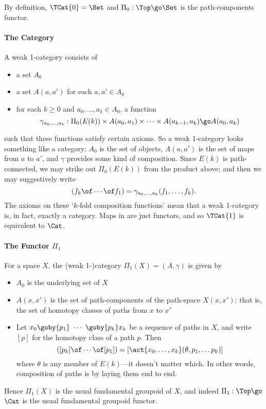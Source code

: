 
By definition, $\TCat{0}=\Set$ and $\Pi_0: \Top\go\Set$ is the
path-components functor.



\paragraph{The Category }

A weak 1-category  consists of
%
\begin{itemize}
\item a set $A_0$
\item a set $A(a,a')$ for each $a, a' \in A_0$
\item for each $k\geq 0$ and $a_0, \ldots, a_k \in A_0$, a function
\[
\gamma_{a_0, \ldots, a_k}:
\Pi_0(E(k)) \times A(a_0,a_1) \times\cdots\times A(a_{k-1},a_k)
\go
A(a_0,a_k)
\]
\end{itemize}
%
such that these functions satisfy certain axioms.  So a weak 1-category looks
something like a category: $A_0$ is the set of objects, $A(a,a')$ is
the set of maps from $a$ to $a'$, and $\gamma$ provides some kind of
composition.  Since $E(k)$ is path-connected, we may strike out $\Pi_0(E(k))$
from the product above; and then we may suggestively write
\[
(f_k \of\cdots\of f_1) = \gamma_{a_0, \ldots, a_k}(f_1, \ldots, f_k).
\]
The axioms on these `$k$-fold composition functions' mean that a weak
1-category is, in fact, exactly a category.  Maps in  are just
functors, and so $\TCat{1}$ is equivalent to $\Cat$.

\paragraph{The Functor $\Pi_1$} 

For a space $X$, the (weak 1-)category
$\Pi_1(X) = (A,\gamma)$ is given by
%
\begin{itemize}
\item $A_0$ is the underlying set of $X$
\item $A(x,x')$ is the set of path-components of the path-space $X(x,x')$:
that is, the set of homotopy classes of paths from $x$ to $x'$
\item Let $x_0 \goby{p_1} \ \cdots\ \goby{p_k} x_k$ be a sequence of paths in
$X$, and write $[p]$ for the homotopy class of a path $p$.  Then
\[
([p_k] \of \cdots \of [p_1]) = 
[\act{x_0,\ldots,x_k}(\theta, p_1, \ldots p_k)]
\]
where $\theta$ is any member of $E(k)$---it doesn't matter which.  In other
words, composition of paths is by laying them end to end.
\end{itemize}
%
Hence $\Pi_1(X)$ is the usual fundamental groupoid of $X$, and indeed $\Pi_1:
\Top \go$ $\Cat$ is the usual fundamental groupoid functor.




